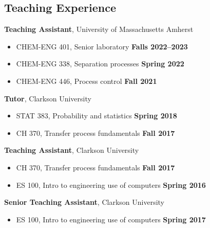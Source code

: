\documentclass[margin,line]{res}
\begin{document}
\begin{resume}
	\section{\sc Teaching Experience}
	 {\bf Teaching Assistant}, University of Massachusetts Amherst
	\vspace*{.05in}
	\begin{itemize}
		\item[ ] CHEM-ENG 401, Senior laboratory \hfill {\bf Falls 2022--2023}
		\item[ ] CHEM-ENG 338, Separation processes \hfill {\bf Spring 2022}
		\item[ ] CHEM-ENG 446, Process control \hfill {\bf Fall 2021}
	\end{itemize}
	{\bf Tutor}, Clarkson University
	\vspace*{.05in}
	\begin{itemize}
		\item[ ] STAT 383, Probability and statistics \hfill {\bf Spring 2018}
		\item[ ] CH 370, Transfer process fundamentals \hfill {\bf Fall 2017}
	\end{itemize}
	{\bf Teaching Assistant}, Clarkson University
	\vspace*{.05in}
	\begin{itemize}
		\item[ ] CH 370, Transfer process fundamentals \hfill {\bf Fall 2017}
		\item[ ] ES 100, Intro to engineering use of computers \hfill {\bf Spring 2016}
	\end{itemize}
	{\bf Senior Teaching Assistant}, Clarkson University
	\vspace*{.05in}
	\begin{itemize}
		\item[ ] ES 100, Intro to engineering use of computers \hfill {\bf Spring 2017}
	\end{itemize}


\end{resume}
\end{document}
